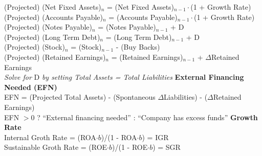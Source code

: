 \documentclass{article}
\begin{document}
(Projected) (Net Fixed Assets)$_n$ = (Net Fixed Assets)$_{n - 1} \cdot$(1 + Growth Rate) \\
(Projected) (Accounts Payable)$_n$ = (Accounts Payable)$_{n - 1} \cdot$(1 + Growth Rate) \\
(Projected) (Notes Payable)$_n$ = (Notes Payable)$_{n - 1}$ + D \\
(Projected) (Long Term Debt)$_n$ = (Long Term Debt)$_{n - 1}$ + D \\
(Projected) (Stock)$_n$ = (Stock)$_{n - 1}$ - (Buy Backs) \\
(Projected) (Retained Earnings)$_n$ = (Retained Earnings)$_{n - 1}$ + $\Delta$Retained Earnings \\
\textit{Solve for} D \textit{by setting Total Assets = Total Liabilities}
\newline
\textbf{External Financing Needed (EFN)} \\
EFN = (Projected Total Assets) - (Spontaneous $\Delta$Liabilities) - ($\Delta$Retained Earnings) \\
EFN $> 0$ ? ``External financing needed'' : ``Company has excess funds''
\newline
\textbf{Growth Rate} \\
Internal Groth Rate = (ROA$\cdot b$)/(1 - ROA$\cdot b$) = IGR \\
Sustainable Groth Rate = (ROE$\cdot b$)/(1 - ROE$\cdot b$) = SGR \\
\end{document}

